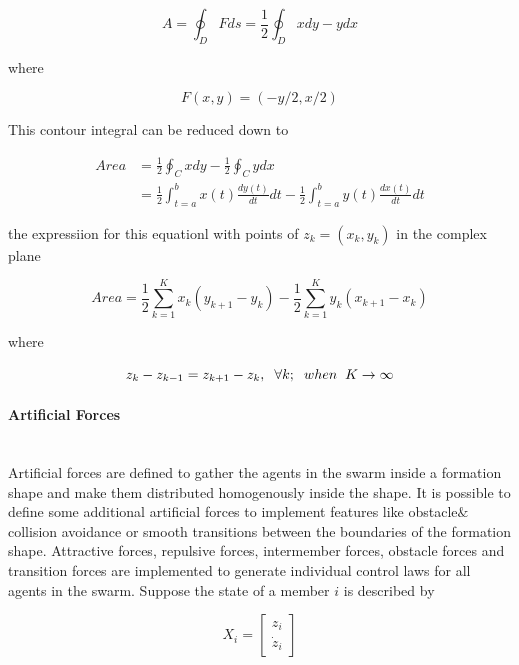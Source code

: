 \begin{equation}
 A = \oint_D F ds = \frac{1}{2} \oint_D xdy - ydx
\end{equation}

where

\begin{equation}
F(x,y) = (-y/2,x/2)
\end{equation}
		
This contour integral can be reduced down to

\begin{align*}
Area &= \frac{1}{2} \oint_C xdy - \frac{1}{2} \oint_C ydx \\
&= \frac{1}{2} \int_{t=a}^{b} x(t)\frac{dy(t)}{dt}dt - \frac{1}{2} \int_{t=a}^{b}y(t)\frac{dx(t)}{dt}dt
\end{align*}
		
the expressiion for this equationl with points of  $z_k = (x_k,y_k)$ in the complex plane
			
\begin{equation}
Area = \frac{1}{2} \sum_{k=1}^{K} x_k(y_{k+1} - y_k) - \frac{1}{2} \sum_{k=1}^{K}y_k(x_{k+1} - x_k)
\end{equation}
			
where

\begin{equation}
z_k - z_{k-1} = z_{k+1} - z_k, \hspace{0.2cm}  \forall k ;  \hspace{0.2cm} when  \hspace{0.2cm} K \to\infty
\end{equation}

\paragraph{Artificial Forces}\hspace{0pt} \\
Artificial forces are defined to gather the agents in the swarm inside a formation shape and make them distributed homogenously inside the shape. It is possible to define some additional artificial forces to implement features like obstacle$\&$collision avoidance or smooth transitions between the boundaries of the formation shape. Attractive forces, repulsive forces, intermember forces, obstacle forces and transition forces are implemented to generate individual control laws for all agents in the swarm. Suppose the state of a member $i$ is described by

\begin{equation}
X_i = \begin{bmatrix}
z_i\\ \dot{z}_i
\end{bmatrix}
\end{equation}

